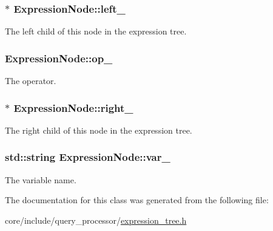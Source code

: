 \subsubsection[{left\+\_\+}]{$\ast$ Expression\+Node\+::left\+\_\+\hspace{0.3cm}{\ttfamily [private]}}\label{classExpressionNode_a5f5dc68940e065fb3ae3cba23c3e1f44}
The left child of this node in the expression tree. \hypertarget{classExpressionNode_aa55e5451dc4ea9ed725352a728512eff}{}
\subsubsection[{op\+\_\+}]{ Expression\+Node\+::op\+\_\+\hspace{0.3cm}{\ttfamily [private]}}\label{classExpressionNode_aa55e5451dc4ea9ed725352a728512eff}
The operator. \hypertarget{classExpressionNode_a5116bfa5453532ccc2b00f373da4f245}{}
\subsubsection[{right\+\_\+}]{$\ast$ Expression\+Node\+::right\+\_\+\hspace{0.3cm}{\ttfamily [private]}}\label{classExpressionNode_a5116bfa5453532ccc2b00f373da4f245}
The right child of this node in the expression tree. \hypertarget{classExpressionNode_aef84ffa8692cd45724587997b4b6bfc2}{}
\subsubsection[{var\+\_\+}]{\setlength{\rightskip}{0pt plus 5cm}std\+::string Expression\+Node\+::var\+\_\+\hspace{0.3cm}{\ttfamily [private]}}\label{classExpressionNode_aef84ffa8692cd45724587997b4b6bfc2}
The variable name. 

The documentation for this class was generated from the following file\+:\begin{DoxyCompactItemize}
\item 
core/include/query\+\_\+processor/\hyperlink{expression__tree_8h}{expression\+\_\+tree.\+h}\end{DoxyCompactItemize}

